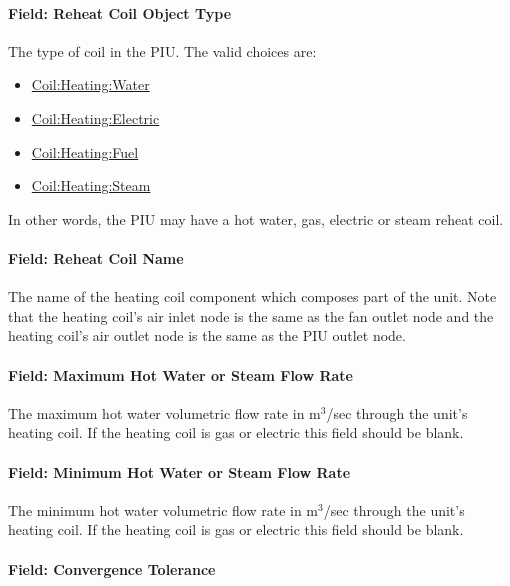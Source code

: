 \paragraph{Field: Reheat Coil Object Type}\label{field-reheat-coil-object-type-3}

The type of coil in the PIU. The valid choices are:

\begin{itemize}
\item
  \hyperref[coilheatingwater]{Coil:Heating:Water}
\item
  \hyperref[coilheatingelectric]{Coil:Heating:Electric}
\item
  \hyperref[coilheatinggas-000]{Coil:Heating:Fuel}
\item
  \hyperref[coilheatingsteam]{Coil:Heating:Steam}
\end{itemize}

In other words, the PIU may have a hot water, gas, electric or steam reheat coil.

\paragraph{Field: Reheat Coil Name}\label{field-reheat-coil-name-3}

The name of the heating coil component which composes part of the unit. Note that the heating coil's air inlet node is the same as the fan outlet node and the heating coil's air outlet node is the same as the PIU outlet node.

\paragraph{Field: Maximum Hot Water or Steam Flow Rate}\label{field-maximum-hot-water-or-steam-flow-rate-4}

The maximum hot water volumetric flow rate in m\(^{3}\)/sec through the unit's heating coil. If the heating coil is gas or electric this field should be blank.

\paragraph{Field: Minimum Hot Water or Steam Flow Rate}\label{field-minimum-hot-water-or-steam-flow-rate-4}

The minimum hot water volumetric flow rate in m\(^{3}\)/sec through the unit's heating coil. If the heating coil is gas or electric this field should be blank.

\paragraph{Field: Convergence Tolerance}\label{field-convergence-tolerance-3}

